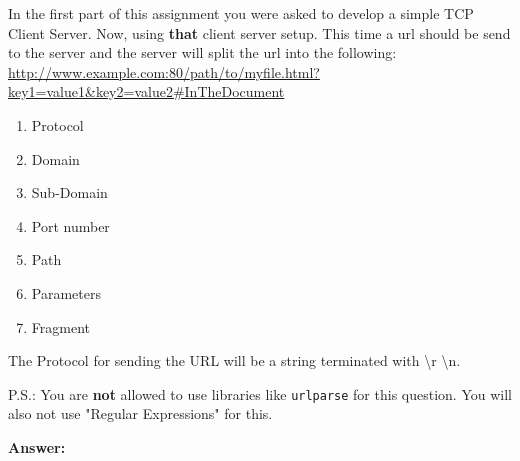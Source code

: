 \documentclass{WeSTassignment}
\begin{document}
In the first part of this assignment you were asked to develop a simple TCP Client Server. Now, using \textbf{that} client server setup.
This time a url should be send to the server and the server will split the url into the following:\\ 

\url{http://www.example.com:80/path/to/myfile.html?key1=value1&key2=value2#InTheDocument}

\begin{enumerate}
\item Protocol
\item Domain
\item Sub-Domain
\item Port number
\item Path
\item Parameters
\item Fragment
\end{enumerate}

The Protocol for sending the URL will be a string terminated with \backslash r \backslash n.

P.S.: You are \textbf{not} allowed to use libraries like \texttt{urlparse} for this question. You will also not use "Regular Expressions" for this. 

\textbf{Answer:} 
\end{document}

